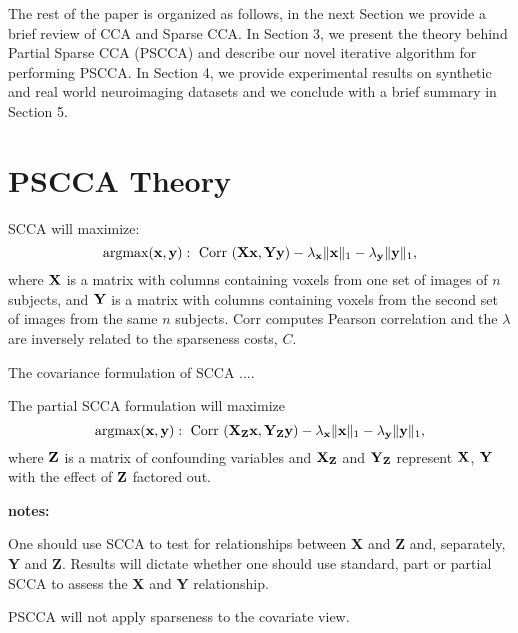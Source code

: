 \documentclass{llncs}
\newcommand{\X}{{\bf X}}
\newcommand{\x}{{\bf x}}
\newcommand{\Y}{{\bf Y}}
\newcommand{\y}{{\bf y}}
\newcommand{\Z}{{\bf Z}}
\begin{document}
The rest of the paper is organized as follows, in the next Section we provide a brief review of CCA and Sparse CCA. In Section 3, we present the theory behind Partial Sparse CCA (PSCCA) and describe our novel iterative algorithm for performing PSCCA. In Section 4, we provide experimental results on synthetic and real world neuroimaging datasets and we conclude with a brief summary in Section 5.



\section{PSCCA Theory}
SCCA will maximize:
\begin{equation}
\text{argmax}( \x,\y) :
~\text{Corr}~( \X \x , \Y \y) - \lambda_\x \| \x \|_1 - \lambda_\y \|  \y  \|_1 , 
\end{equation} 
where $\X$ is a matrix with columns containing voxels from one set of
images of $n$ subjects, 
and $\Y$ is a matrix with columns containing voxels from the second
set of images from the same $n$ subjects. 
Corr computes Pearson correlation and the
$\lambda$ are inversely related to the sparseness costs, $C$.  %

The covariance formulation of SCCA .... 

The partial SCCA formulation will maximize 
\begin{equation}
\text{argmax}( \x,\y) :
~\text{Corr}~( \X_{\Z} \x , \Y_{\Z} \y) - \lambda_\x \| \x \|_1 - \lambda_\y \|  \y  \|_1 , 
\end{equation} 
where $\Z$ is a matrix of confounding variables and $\X_{\Z}$ and
$\Y_{\Z}$ represent $\X$, $\Y$ with the effect of $\Z$ factored out.

{\bf notes:}

One should use SCCA to test for relationships between {\X} and {\Z} and, separately, {\Y} and {\Z}.  Results will dictate whether
one should use standard, part or partial SCCA to assess the {\X} and {\Y}
relationship.

PSCCA will not apply sparseness to the covariate view.  
\end{document}
